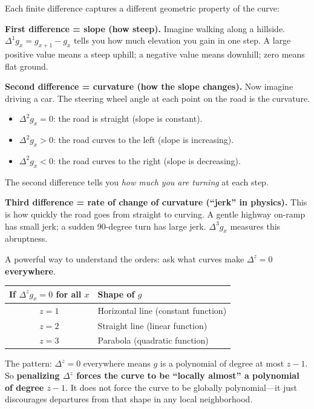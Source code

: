 \documentclass[11pt,a4paper]{article}
\begin{document}
\begin{intuition}
Each finite difference captures a different geometric property of the curve:

\medskip
\textbf{First difference = slope (how steep).}
Imagine walking along a hillside.  $\Delta^1 g_x = g_{x+1} - g_x$ tells you how much elevation you gain in one step.  A large positive value means a steep uphill; a negative value means downhill; zero means flat ground.

\medskip
\textbf{Second difference = curvature (how the slope changes).}
Now imagine driving a car.  The steering wheel angle at each point on the road is the curvature.
\begin{itemize}[nosep]
  \item $\Delta^2 g_x = 0$: the road is straight (slope is constant).
  \item $\Delta^2 g_x > 0$: the road curves to the left (slope is increasing).
  \item $\Delta^2 g_x < 0$: the road curves to the right (slope is decreasing).
\end{itemize}
The second difference tells you \emph{how much you are turning} at each step.

\medskip
\textbf{Third difference = rate of change of curvature (``jerk'' in physics).}
This is how quickly the road goes from straight to curving.  A gentle highway on-ramp has small jerk; a sudden 90-degree turn has large jerk.  $\Delta^3 g_x$ measures this abruptness.
\end{intuition}

\begin{intuition}
A powerful way to understand the orders: ask what curves make $\Delta^z = 0$ \textbf{everywhere}.

\begin{center}
\renewcommand{\arraystretch}{1.3}
\begin{tabular}{cl}
\toprule
\textbf{If $\Delta^z g_x = 0$ for all $x$} & \textbf{Shape of $g$} \\
\midrule
$z = 1$ & Horizontal line (constant function) \\
$z = 2$ & Straight line (linear function) \\
$z = 3$ & Parabola (quadratic function) \\
\bottomrule
\end{tabular}
\end{center}

The pattern: $\Delta^z = 0$ everywhere means $g$ is a polynomial of degree at most $z-1$.  So \textbf{penalizing $\Delta^z$ forces the curve to be ``locally almost'' a polynomial of degree $z-1$}.  It does not force the curve to be globally polynomial---it just discourages departures from that shape in any local neighborhood.
\end{intuition}
\end{document}
